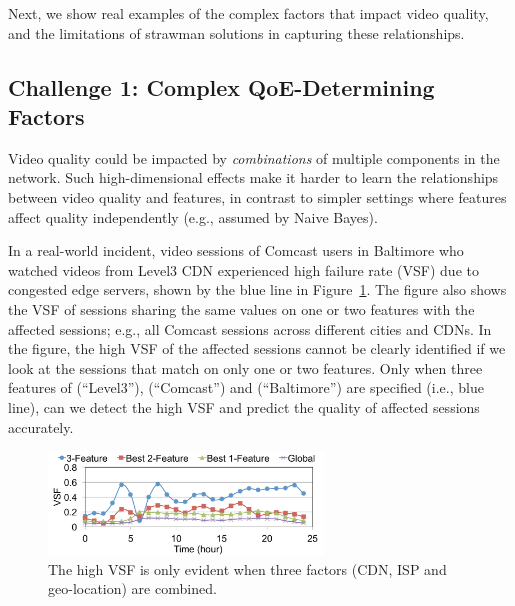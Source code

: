Next, we show real examples of the complex factors 
that impact video quality, and the limitations of strawman
solutions in capturing these relationships.

\subsection{Challenge 1: Complex QoE-Determining Factors}
\label{subsec:expressive}

Video quality could be impacted by {\em combinations} 
of multiple components in the network. 
Such high-dimensional effects make 
it harder to learn the relationships between video 
quality  and features, in contrast to simpler settings 
where features affect quality independently 
(e.g., assumed by Naive Bayes).




In a real-world incident,
video sessions of Comcast users in Baltimore who watched 
videos from Level3 CDN experienced high failure rate (VSF) 
due to congested edge servers, shown by the blue line in 
Figure~\ref{fig:timeseries-expressive-model}.
The figure also shows the VSF of sessions sharing the same
values on one or two features with the affected sessions; 
e.g., all Comcast sessions across different cities and CDNs. 
In the figure, the high VSF of the affected sessions cannot be 
clearly identified if we look at the sessions 
 that match on only one or two features.
Only when three features of \fCDN (``Level3''), 
\fASN (``Comcast'') and \fCity (``Baltimore'') 
are specified (i.e., blue line), can we detect the 
high VSF and predict the quality of 
affected sessions accurately. 

\begin{figure}[t!]
\centering
\includegraphics[width=0.65\textwidth]{figures/cfa-example-highdimension-timeseries.pdf}
\caption{The high VSF is only evident when three factors 
(CDN, ISP and geo-location) are combined.}
\label{fig:timeseries-expressive-model}
\end{figure}

